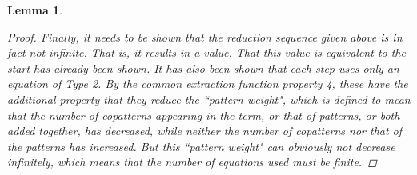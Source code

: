 \documentclass[11pt]{article} %
\newtheorem{lemma}{Lemma}
\begin{document}
\begin{lemma}
\begin{proof}
Finally, it needs to be shown that the reduction sequence given above is in fact not infinite. That is, it results in a value. That this value is equivalent to the start has already been shown. It has also been shown that each step uses only an equation of Type 2. By the common extraction function property 4, these have the additional property that they reduce the ``pattern weight", which is defined to mean that the number of copatterns appearing in the term, or that of patterns, or both added together, has decreased, while neither the number of copatterns nor that of the patterns has increased. But this ``pattern weight" can obviously not decrease infinitely, which means that the number of equations used must be finite.

\end{proof}

\end{lemma}
\end{document}
